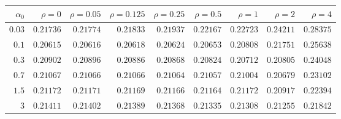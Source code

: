 \begin{tabular}{rrrrrrrrr}
\hline
$\alpha_0$ & $\rho=0$ & $\rho=0.05$ & $\rho=0.125$ & $\rho=0.25$ & $\rho=0.5$ & $\rho=1$ & $\rho=2$ & $\rho=4$ \\
\hline
$0.03$ & $0.21736$ & $0.21774$ & $0.21833$ & $0.21937$ & $0.22167$ & $0.22723$ & $0.24211$ & $0.28375$ \\
$0.1$ & $\mathbf{0.20615}$ & $0.20616$ & $0.20618$ & $0.20624$ & $0.20653$ & $0.20808$ & $0.21751$ & $0.25638$ \\
$0.3$ & $0.20902$ & $0.20896$ & $0.20886$ & $0.20868$ & $0.20824$ & $0.20712$ & $0.20805$ & $0.24048$ \\
$0.7$ & $0.21067$ & $0.21066$ & $0.21066$ & $0.21064$ & $0.21057$ & $0.21004$ & $0.20679$ & $0.23102$ \\
$1.5$ & $0.21172$ & $0.21171$ & $0.21169$ & $0.21166$ & $0.21164$ & $0.21172$ & $0.20917$ & $0.22394$ \\
$3$ & $0.21411$ & $0.21402$ & $0.21389$ & $0.21368$ & $0.21335$ & $0.21308$ & $0.21255$ & $0.21842$ \\
\hline
\end{tabular}

